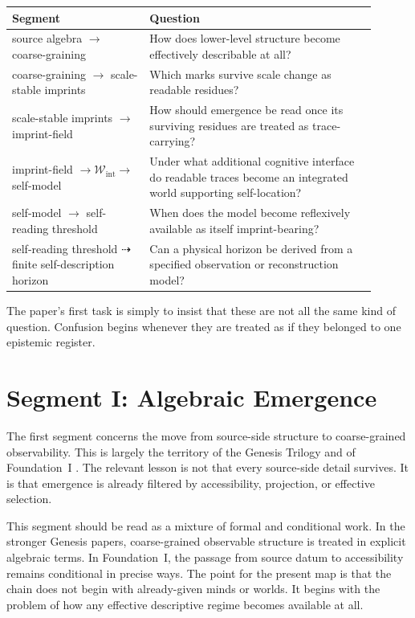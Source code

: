 \documentclass[12pt,a4paper]{article}
\begin{document}
\begin{center}
\begin{tabular}{P{0.34\linewidth}P{0.56\linewidth}}
\toprule
\textbf{Segment} & \textbf{Question} \\
\midrule
source algebra $\to$ coarse-graining & How does lower-level structure become effectively describable at all? \\
coarse-graining $\to$ scale-stable imprints & Which marks survive scale change as readable residues? \\
scale-stable imprints $\to$ imprint-field & How should emergence be read once its surviving residues are treated as trace-carrying? \\
imprint-field $\to\mathcal W_{\mathrm{int}}\to$ self-model & Under what additional cognitive interface do readable traces become an integrated world supporting self-location? \\
self-model $\to$ self-reading threshold & When does the model become reflexively available as itself imprint-bearing? \\
self-reading threshold $\dashrightarrow$ finite self-description horizon & Can a physical horizon be derived from a specified observation or reconstruction model? \\
\bottomrule
\end{tabular}
\end{center}

The paper's first task is simply to insist that these are not all the same kind of question. Confusion begins whenever they are treated as if they belonged to one epistemic register.

\section{Segment I: Algebraic Emergence}

The first segment concerns the move from source-side structure to coarse-grained observability. This is largely the territory of the Genesis Trilogy and of Foundation~I \cite{HAFFA,HAFFD,FoundationI}. The relevant lesson is not that every source-side detail survives. It is that emergence is already filtered by accessibility, projection, or effective selection.

This segment should be read as a mixture of formal and conditional work. In the stronger Genesis papers, coarse-grained observable structure is treated in explicit algebraic terms. In Foundation~I, the passage from source datum to accessibility remains conditional in precise ways. The point for the present map is that the chain does not begin with already-given minds or worlds. It begins with the problem of how any effective descriptive regime becomes available at all.
\end{document}

